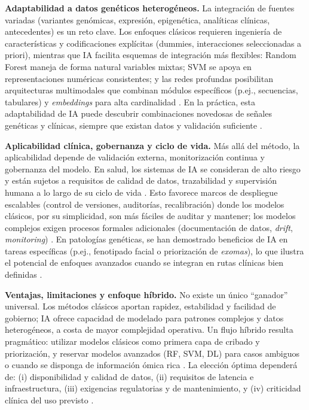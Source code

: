 \documentclass[11pt,a4paper,spanish]{book}
\numberwithin{equation}{chapter}
\numberwithin{figure}{chapter}
\begin{document}
\textbf{Adaptabilidad a datos genéticos heterogéneos.} La integración de fuentes variadas (variantes genómicas, expresión, epigenética, analíticas clínicas, antecedentes) es un reto clave. Los enfoques clásicos requieren ingeniería de características y codificaciones explícitas (dummies, interacciones seleccionadas a priori), mientras que IA facilita esquemas de integración más flexibles: Random Forest maneja de forma natural variables mixtas; SVM se apoya en representaciones numéricas consistentes; y las redes profundas posibilitan arquitecturas multimodales que combinan módulos específicos (p.ej., secuencias, tabulares) y \emph{embeddings} para alta cardinalidad \cite{CHEN2012,Libbrecht2015,LeCun_2015,Ching_2018}. En la práctica, esta adaptabilidad de IA puede descubrir combinaciones novedosas de señales genéticas y clínicas, siempre que existan datos y validación suficiente \cite{Libbrecht2015,Ching_2018}.

\textbf{Aplicabilidad clínica, gobernanza y ciclo de vida.} Más allá del método, la aplicabilidad depende de validación externa, monitorización continua y gobernanza del modelo. En salud, los sistemas de IA se consideran de alto riesgo y están sujetos a requisitos de calidad de datos, trazabilidad y supervisión humana a lo largo de su ciclo de vida \cite{com2021laying,EC_AI_Act_2025}. Esto favorece marcos de despliegue escalables (control de versiones, auditorías, recalibración) donde los modelos clásicos, por su simplicidad, son más fáciles de auditar y mantener; los modelos complejos exigen procesos formales adicionales (documentación de datos, \emph{drift}, \emph{monitoring}) \cite{Libbrecht2015,topol2019}. En patologías genéticas, se han demostrado beneficios de IA en tareas específicas (p.ej., fenotipado facial o priorización de \emph{exomas}), lo que ilustra el potencial de enfoques avanzados cuando se integran en rutas clínicas bien definidas \cite{gurovich2019,Hsieh_2019}.

\textbf{Ventajas, limitaciones y enfoque híbrido.} No existe un único ``ganador'' universal. Los métodos clásicos aportan rapidez, estabilidad y facilidad de gobierno; IA ofrece capacidad de modelado para patrones complejos y datos heterogéneos, a costa de mayor complejidad operativa. Un flujo híbrido resulta pragmático: utilizar modelos clásicos como primera capa de cribado y priorización, y reservar modelos avanzados (RF, SVM, DL) para casos ambiguos o cuando se disponga de información ómica rica \cite{Breiman2001,cortes1995,Libbrecht2015,LeCun_2015}. La elección óptima dependerá de: (i) disponibilidad y calidad de datos, (ii) requisitos de latencia e infraestructura, (iii) exigencias regulatorias y de mantenimiento, y (iv) criticidad clínica del uso previsto \cite{10.1093/eurheartj/ehu207,EC_AI_Act_2025}. 
\end{document}
